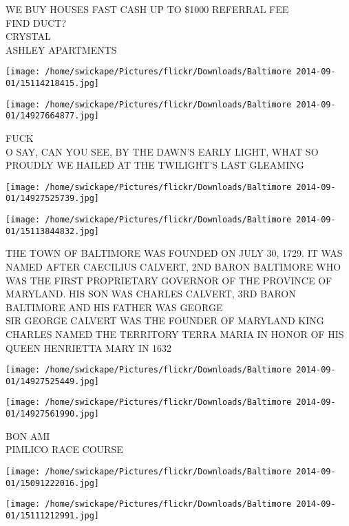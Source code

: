 \documentclass[10pt,letterpaper]{article}
\begin{document}
WE BUY HOUSES FAST CASH UP TO \$1000 REFERRAL FEE\\
FIND DUCT?\\
CRYSTAL\\
ASHLEY APARTMENTS\\
\pagebreak

\texttt{[image: /home/swickape/Pictures/flickr/Downloads/Baltimore 2014-09-01/15114218415.jpg]}

\vspace{0.25in}
\texttt{[image: /home/swickape/Pictures/flickr/Downloads/Baltimore 2014-09-01/14927664877.jpg]}

FUCK\\
O SAY, CAN YOU SEE, BY THE DAWN'S EARLY LIGHT, WHAT SO PROUDLY WE HAILED AT THE TWILIGHT'S LAST GLEAMING\\
\pagebreak

\texttt{[image: /home/swickape/Pictures/flickr/Downloads/Baltimore 2014-09-01/14927525739.jpg]}

\vspace{0.25in}
\texttt{[image: /home/swickape/Pictures/flickr/Downloads/Baltimore 2014-09-01/15113844832.jpg]}

THE TOWN OF BALTIMORE WAS FOUNDED ON JULY 30, 1729.  IT WAS NAMED AFTER CAECILIUS CALVERT, 2ND BARON BALTIMORE WHO WAS THE FIRST PROPRIETARY GOVERNOR OF THE PROVINCE OF MARYLAND.  HIS SON WAS CHARLES CALVERT, 3RD BARON BALTIMORE AND HIS FATHER WAS GEORGE\\
SIR GEORGE CALVERT WAS THE FOUNDER OF MARYLAND KING CHARLES NAMED THE TERRITORY TERRA MARIA IN HONOR OF HIS QUEEN HENRIETTA MARY IN 1632\\
\pagebreak

\texttt{[image: /home/swickape/Pictures/flickr/Downloads/Baltimore 2014-09-01/14927525449.jpg]}

\vspace{0.25in}
\texttt{[image: /home/swickape/Pictures/flickr/Downloads/Baltimore 2014-09-01/14927561990.jpg]}

BON AMI\\
PIMLICO RACE COURSE\\
\pagebreak

\texttt{[image: /home/swickape/Pictures/flickr/Downloads/Baltimore 2014-09-01/15091222016.jpg]}

\vspace{0.25in}
\texttt{[image: /home/swickape/Pictures/flickr/Downloads/Baltimore 2014-09-01/15111212991.jpg]}
\end{document}
